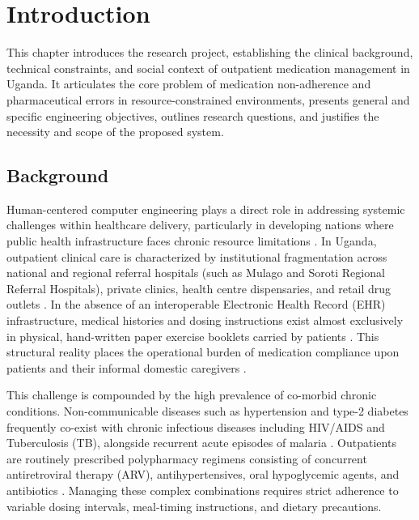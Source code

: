 \chapter{Introduction}
\label{ch:intro}

This chapter introduces the research project, establishing the clinical background, technical constraints, and social context of outpatient medication management in Uganda. It articulates the core problem of medication non-adherence and pharmaceutical errors in resource-constrained environments, presents general and specific engineering objectives, outlines research questions, and justifies the necessity and scope of the proposed system.

\section{Background}

Human-centered computer engineering plays a direct role in addressing systemic challenges within healthcare delivery, particularly in developing nations where public health infrastructure faces chronic resource limitations \cite{who2017medication, mechael2009case}. In Uganda, outpatient clinical care is characterized by institutional fragmentation across national and regional referral hospitals (such as Mulago and Soroti Regional Referral Hospitals), private clinics, health centre dispensaries, and retail drug outlets \cite{moh2023performance, kintu2021development}. In the absence of an interoperable Electronic Health Record (EHR) infrastructure, medical histories and dosing instructions exist almost exclusively in physical, hand-written paper exercise booklets carried by patients \cite{kintu2021development}. This structural reality places the operational burden of medication compliance upon patients and their informal domestic caregivers \cite{ware2009social}.

This challenge is compounded by the high prevalence of co-morbid chronic conditions. Non-communicable diseases such as hypertension and type-2 diabetes frequently co-exist with chronic infectious diseases including HIV/AIDS and Tuberculosis (TB), alongside recurrent acute episodes of malaria \cite{moh2023guidelines}. Outpatients are routinely prescribed polypharmacy regimens consisting of concurrent antiretroviral therapy (ARV), antihypertensives, oral hypoglycemic agents, and antibiotics \cite{muddu2021hypertension}. Managing these complex combinations requires strict adherence to variable dosing intervals, meal-timing instructions, and dietary precautions.

